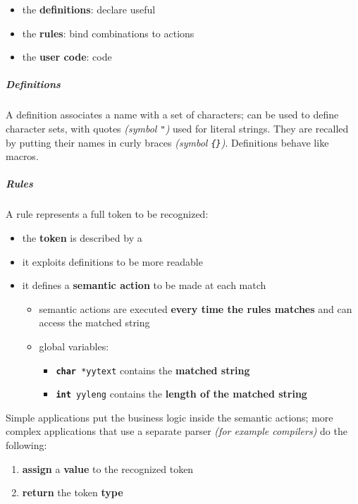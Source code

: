 \documentclass[english]{article}
\begin{document}
\begin{itemize}
  \item the \textbf{definitions}: declare useful \re
  \item the \textbf{rules}: bind \re combinations to actions
  \item the \textbf{user code}: \clang code
\end{itemize}

\subparagraph*{Definitions}
A definition associates a name with a set of characters;
\re can be used to define character sets, with quotes \textit{(symbol \texttt{"})} used for literal strings.
They are recalled by putting their names in curly braces \textit{(symbol \texttt{\{\}})}.
Definitions behave like \clang macros.

\subparagraph*{Rules}
A rule represents a full token to be recognized:

\begin{itemize}
  \item the \textbf{token} is described by a \re
  \item it exploits definitions to be more readable
  \item it defines a \textbf{semantic action} to be made at each match
        \begin{itemize}
          \item semantic actions are executed \textbf{every time the rules matches} and can access the matched string
          \item global variables:
                \begin{itemize}[label=\textbf{\texttt{>}}]
                  \item \texttt{\textbf{char} *yytext} contains the \textbf{matched string}
                  \item \texttt{\textbf{int} yyleng} contains the \textbf{length of the matched string}
                \end{itemize}
        \end{itemize}
\end{itemize}

Simple applications put the business logic inside the semantic actions;
more complex applications that use a separate parser \textit{(for example compilers)} do the following:

\begin{enumerate}
  \item \textbf{assign} a \textbf{value} to the recognized token
  \item \textbf{return} the token \textbf{type}
\end{enumerate}
\end{document}
